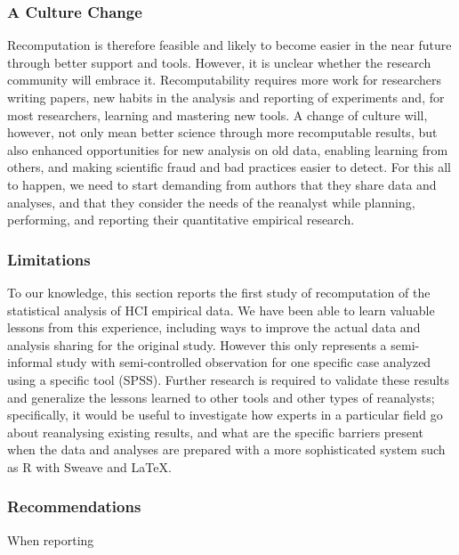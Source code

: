 \subsubsection{A Culture Change}
Recomputation is therefore feasible and likely to become easier in the near future through better support and tools. However, it is unclear whether the research community will embrace it. Recomputability requires more work for researchers writing papers, new habits in the analysis and reporting of experiments and, for most researchers, learning and mastering new tools. A change of culture will, however, not only mean better science through more recomputable results, but also enhanced opportunities for new analysis on old data, enabling learning from others, and making scientific fraud and bad practices easier to detect. For this all to happen, we need to start demanding from authors that they share data and analyses, and that they consider the needs of the reanalyst while planning, performing, and reporting their quantitative empirical research. 

\subsubsection{Limitations}
To our knowledge, this section reports the first study of recomputation of the statistical analysis of HCI empirical data. We have been able to learn valuable lessons from this experience, including ways to improve the actual data and analysis sharing for the original study. However this only represents a semi-informal study with semi-controlled observation for one specific case analyzed using a specific tool (SPSS). Further research is required to validate these results and generalize the lessons learned to other tools and other types of reanalysts; specifically, it would be useful to investigate how experts in a particular field go about reanalysing existing results, and what are the specific barriers present when the data and analyses are prepared with a more sophisticated system such as R with Sweave and LaTeX.

\subsubsection{Recommendations}
When reporting 
